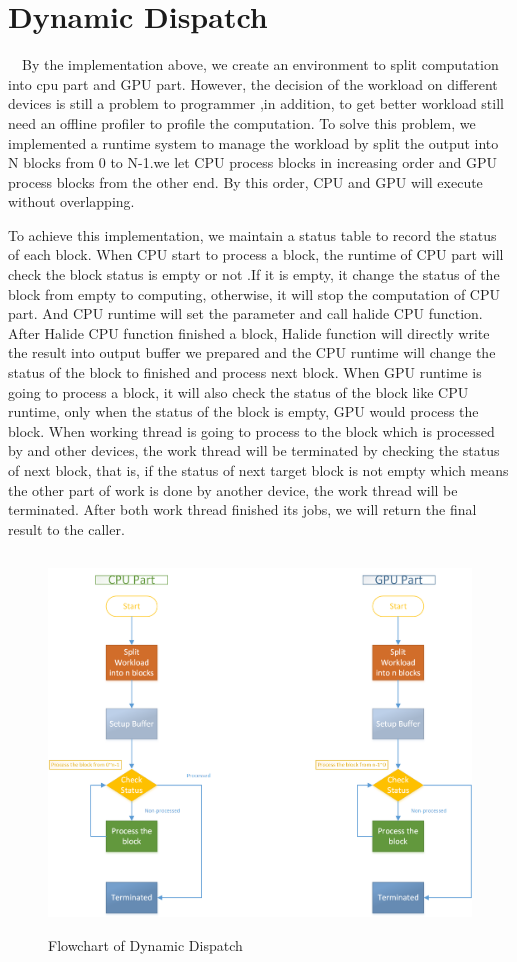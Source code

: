 \section{Dynamic Dispatch}

\quad \ \ By the implementation above, we create an environment to split computation into cpu part and GPU part. However, the decision of the workload on different devices is still  a problem to programmer ,in addition, to get better workload still need an offline profiler to profile the computation. To solve this problem, we implemented a runtime system to manage the workload by split the output into N blocks from 0 to N-1.we let CPU process blocks in increasing order and GPU process blocks from the other end. By this order, CPU and GPU will execute without overlapping.

	To achieve this implementation, we maintain a status table to record the status of each block. When CPU start to process a block, the runtime of CPU part will check the block status is empty or not .If it is empty, it change the status of the block from empty to computing, otherwise, it will stop the computation of CPU part. And CPU runtime will set the parameter and call halide CPU function. After Halide CPU function finished a block, Halide function will directly write the result into output buffer we prepared and the CPU runtime will change the status of the block to finished and process next block. When GPU runtime is going to process a block, it will also check the status of the block like CPU runtime, only when the status of the block is empty, GPU would process the block. When working thread is going to process to the block which is processed by and other devices, the work thread will be terminated by checking the status of next block, that is, if the status of next target block is not empty which means the other part of work is done by another device, the work thread will be terminated. After both work thread finished its jobs, we will return the final result to the caller.
\begin{figure}[hbtp]
\centering
\includegraphics[height=10cm]{img/DynamicDispatchFlow.png}
\caption{Flowchart of Dynamic Dispatch}
\label{fig:my_label}
\end{figure}

